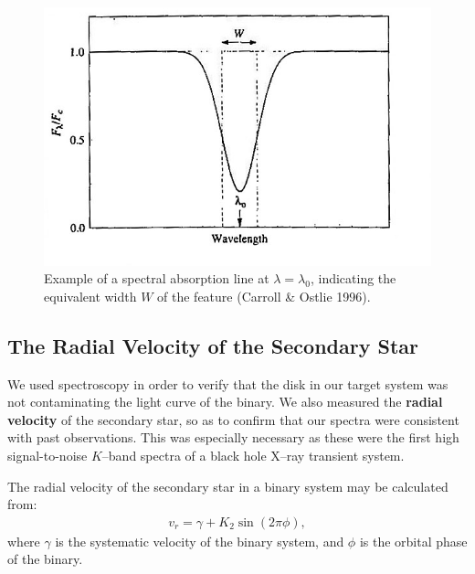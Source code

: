 \begin{figure}[!htb]
\begin{center}
\includegraphics[width=5.0in]{CarrollEquiv}
\caption{%
Example of a spectral absorption line at $\lambda=\lambda_0$,
indicating the equivalent width $W$ of the
feature (Carroll \& Ostlie 1996). }%
\label{cha:InfraredDataReductionTechniques:sec:Spectroscopy:subsec:EquivalentWidth:fig:CarrollEquiv}
\end{center}
\end{figure}

\nocite{CarrollOstlie:1996}


\subsection{The Radial Velocity of the Secondary Star}
\label{cha:InfraredDataReductionTechniques:sec:Spectroscopy:subsec:RadialVelocity}

We used spectroscopy in order to verify that the disk in our target system was not contaminating the light curve of the binary. We also measured the \textbf{radial velocity} of the secondary star, so as to confirm that our spectra were consistent with past observations. This was especially necessary as these were the first high signal-to-noise $K$--band spectra of a black hole X--ray
transient system. 

\vspace{\myparskip}

The radial velocity of the secondary star in a
binary system may be calculated from:
\begin{eqnarray}
\label{cha:InfraredDataReductionTechniques:sec:Spectroscopy:subsec:RadialVelocity:eqn:Vr}
v_r = \gamma + K_2 \sin{(2\pi\phi)},
\end{eqnarray}
where $\gamma$ is the systematic velocity of the binary system, and
$\phi$ is the orbital phase of the binary.  

